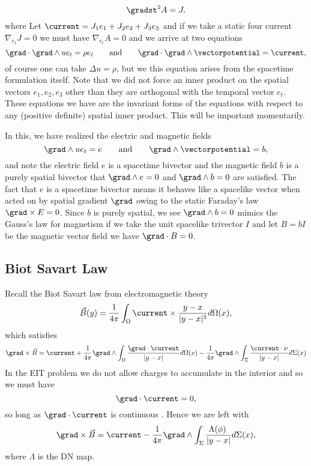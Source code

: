 \[
\gradst^2 A = J,
\]
where Let $\current = J_1 e_1 + J_2 e_2 + J_3 e_3$ and if we take a static four current $\nabla_{e_t} J=0$ we must have $\nabla_{e_t} A =0$ and we arrive at two equations
\[
\grad \cdot \grad \wedge u e_t = \rho e_t \qquad \textrm{and} \qquad \grad \cdot \grad \wedge \vectorpotential = \current, 
\]
of course one can take $\Delta u = \rho$, but we this equation arises from the spacetime formulation itself. Note that we did not force an inner product on the spatial vectors $e_1,e_2,e_3$ other than they are orthogonal with the temporal vector $e_t$.  These equations we have are the invariant forms of the equations with respect to any (positive definite) spatial inner product. This will be important momentarily.

In this, we have realized the electric and magnetic fields
\[
\grad \wedge u e_t = e \qquad \textrm{and} \qquad \grad \wedge \vectorpotential = b,
\]
and note the electric field $e$ is a spacetime bivector and the magnetic field $b$ is a purely spatial bivector that $\grad \wedge e = 0$ and $\grad \wedge b =0$ are satisfied. The fact that $e$ is a spacetime bivector means it behaves like a spacelike vector when acted on by spatial gradient $\grad$ owing to the static Faraday's law $\grad \times E =0$. Since $b$ is purely spatial, we see $\grad \wedge b = 0$ mimics the Gauss's law for magnetism if we take the unit spacelike trivector $I$ and let $B=bI$ be the magnetic vector field we have $\grad \cdot B = 0$.



\subsection{Biot Savart Law}

Recall the Biot Savart law from electromagnetic theory
\[
\vec{B}(y)=\frac{1}{4\pi} \int_\Omega \current \times \frac{y-x}{|y-x|^3} d\Omega(x),
\]
which satisfies 
\[
\grad \times \vec{B} = \current + \frac{1}{4\pi} \grad \wedge \int_\Omega \frac{\grad \cdot \current}{|y-x|}d\Omega(x) -\frac{1}{4\pi} \grad \wedge \int_\Sigma \frac{\current \cdot \nu}{|y-x|}d\Sigma(x)
\]
In the EIT problem we do not allow charges to accumulate in the interior and so we must have
\[
\grad \cdot \current = 0,
\]
so long as $\grad \cdot \current$ is continuous \cite{feldman_calderproblem_nodate}. Hence we are left with
\[
\grad \times \vec{B} = \current -\frac{1}{4\pi} \grad \wedge \int_\Sigma \frac{\Lambda(\phi)\\}{|y-x|}d\Sigma(x),
\]
where $\Lambda$ is the DN map.

